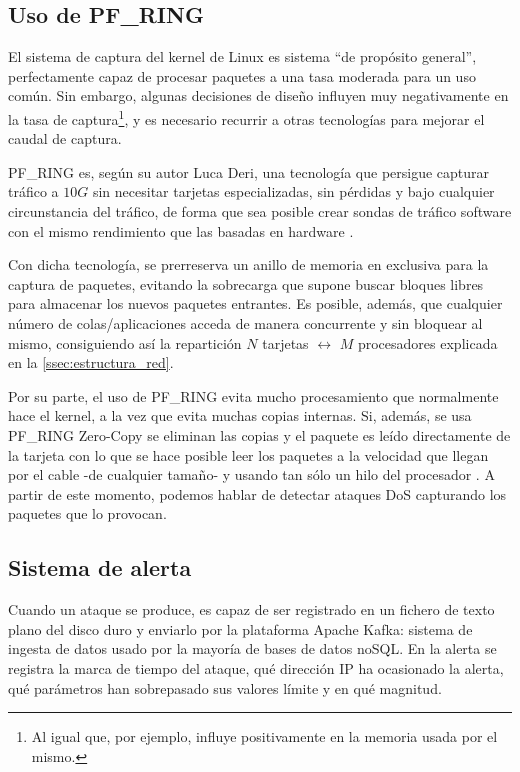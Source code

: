 \subsection{Uso de PF\_RING}
El sistema de captura del kernel de Linux es sistema ``de propósito general'', perfectamente capaz de
procesar paquetes a una tasa moderada para un uso común. Sin embargo,
algunas decisiones de diseño influyen muy negativamente en la tasa de captura\footnote{Al igual que,
por ejemplo, influye positivamente en la memoria usada por el mismo.}, y es necesario recurrir
a otras tecnologías para mejorar el caudal de captura.

PF\_RING es, según su autor Luca Deri, una tecnología que 
persigue capturar tráfico a $10G$ sin necesitar tarjetas especializadas, sin pérdidas y bajo cualquier
circunstancia del tráfico, de forma que sea posible crear sondas de tráfico software con el mismo 
rendimiento que las basadas en hardware \cite{LucaDeriPFRING}. %

Con dicha tecnología, se prerreserva un anillo de memoria en exclusiva para la captura de paquetes,
evitando la sobrecarga que supone buscar bloques libres para almacenar los nuevos paquetes entrantes.
Es posible, además, que cualquier número de colas/aplicaciones acceda de manera concurrente y sin bloquear al mismo,
consiguiendo así la repartición $N$ tarjetas $\leftrightarrow$ $M$ procesadores explicada en
la \autoref{ssec:estructura_red}.

Por su parte, el uso de PF\_RING evita mucho procesamiento que normalmente hace el kernel, a la vez que evita
muchas copias internas. Si, además, se usa PF\_RING Zero-Copy se eliminan las copias y el paquete es leído
directamente de la tarjeta con lo que se hace posible leer los paquetes a la velocidad que llegan por
el cable -de cualquier tamaño- y usando tan sólo un hilo del procesador \cite{PFRingZc}. A partir de este momento,
podemos hablar de detectar ataques \gls{DoS} capturando los paquetes que lo provocan.

\subsection{Sistema de alerta}
Cuando un ataque se produce, \redborderddos{} es capaz de ser registrado en un fichero de texto
plano del disco duro y enviarlo por la plataforma Apache Kafka: sistema
de ingesta de datos usado por la mayoría de bases de datos noSQL. En la 
alerta se registra la marca de tiempo del ataque, qué dirección IP ha ocasionado la alerta,
qué parámetros han sobrepasado sus valores límite y en qué magnitud.

